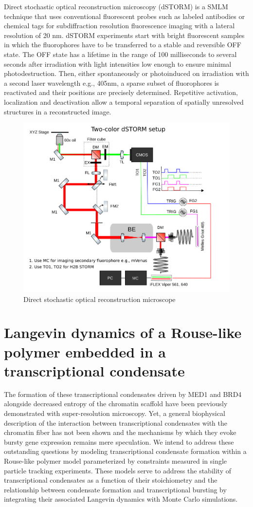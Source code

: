 \documentclass{article}
\begin{document}
Direct stochastic optical reconstruction microscopy (dSTORM) is a SMLM technique that uses conventional fluorescent probes such as labeled antibodies or chemical tags for subdiffraction resolution fluorescence imaging with a lateral resolution of 20 nm. dSTORM experiments start with bright fluorescent samples in which the fluorophores have to be transferred to a stable and reversible OFF state. The OFF state has a lifetime in the range of 100 milliseconds to several seconds after irradiation with light intensities low enough to ensure minimal photodestruction. Then, either spontaneously or photoinduced on irradiation with a second laser wavelength e.g., 405nm, a sparse subset of fluorophores is reactivated and their positions are precisely determined. Repetitive activation, localization and deactivation allow a temporal separation of spatially unresolved structures in a reconstructed image. 


\begin{figure}
\centering
\includegraphics[width=12cm]{dSTORM.png}
\caption{Direct stochastic optical reconstruction microscope}
\end{figure}

\section{Langevin dynamics of a Rouse-like polymer embedded in a transcriptional condensate}

The formation of these transcriptional condensates driven by MED1 and BRD4 alongside decreased entropy of the chromatin scaffold have been previously demonstrated with super-resolution microscopy. Yet, a general biophysical description of the interaction between transcriptional condensates with the chromatin fiber has not been shown and the mechanisms by which they evoke bursty gene expression remains mere speculation. We intend to address these outstanding questions by modeling transcriptional condensate formation within a Rouse-like polymer model parameterized by constraints measured in single particle tracking experiments. These models serve to address the stability of transcriptional condensates as a function of their stoichiometry and the relationship between condensate formation and transcriptional bursting by integrating their associated Langevin dynamics with Monte Carlo simulations. 
\end{document}
